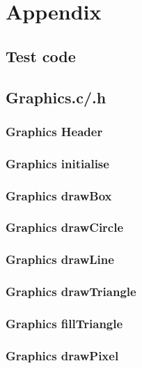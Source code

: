 \documentclass[a4paper,12pt]{article}
\newcommand{\GraphicsC}{../Graphics/Graphics.c}
\newcommand{\GraphicsH}{../Graphics/Graphics.h}
\begin{document}
\section{Appendix}
\subsection{Test code}

\subsection{Graphics.c/.h}
\subsubsection{Graphics Header}

\subsubsection{Graphics initialise}

\newpage
\subsubsection{Graphics drawBox}

\subsubsection{Graphics drawCircle}

\newpage
\subsubsection{Graphics drawLine}

\newpage
\subsubsection{Graphics drawTriangle}

\newpage
\subsubsection{Graphics fillTriangle}

\subsubsection{Graphics drawPixel}

\end{document}
